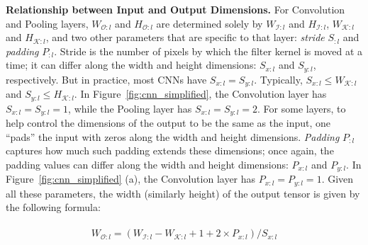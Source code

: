 
\vspace{2mm}
\noindent \textbf{Relationship between Input and Output Dimensions.}
For Convolution and Pooling layers, $W_{\mathcal{O}:l}$ and $H_{\mathcal{O}:l}$ are determined solely by $W_{\mathcal{I}:l}$ and $H_{\mathcal{I}:l}$, $W_{\mathcal{K}:l}$ and $H_{\mathcal{K}:l}$, and two other parameters that are specific to that layer: \textit{stride} $S_{:l}$ and \textit{padding} $P_{:l}$. Stride is the number of pixels by which the filter kernel is moved at a time; it can differ along the width and height dimensions: $S_{x:l}$ and $S_{y:l}$, respectively. But in practice, most CNNs have $S_{x:l} = S_{y:l}$. Typically, $S_{x:l} \leq W_{\mathcal{K}:l}$ and $S_{y:l} \leq H_{\mathcal{K}:l}$. In Figure~\ref{fig:cnn_simplified}, the Convolution layer has $S_{x:l} = S_{y:l} = 1$, while the Pooling layer has $S_{x:l} = S_{y:l} = 2$. For some layers, to help control the dimensions of the output to be the same as the input, one ``pads'' the input with zeros along the width and height dimensions. \textit{Padding} $P_{:l}$ captures how much such padding extends these dimensions; once again, the padding values can differ along the width and height dimensions: $P_{x:l}$ and $P_{y:l}$. In Figure~\ref{fig:cnn_simplified} (a), the Convolution layer has $P_{x:l} = P_{y:l} = 1$. Given all these parameters, the width (similarly height) of the output tensor is given by the following formula:

\vspace{-4mm}
\begin{align}
\begin{split}
W_{\mathcal{O}:l} = (W_{\mathcal{I}:l} - W_{\mathcal{K}:l} + 1 + 2\times P_{x:l})/S_{x:l} \\
\end{split}
\end{align}

